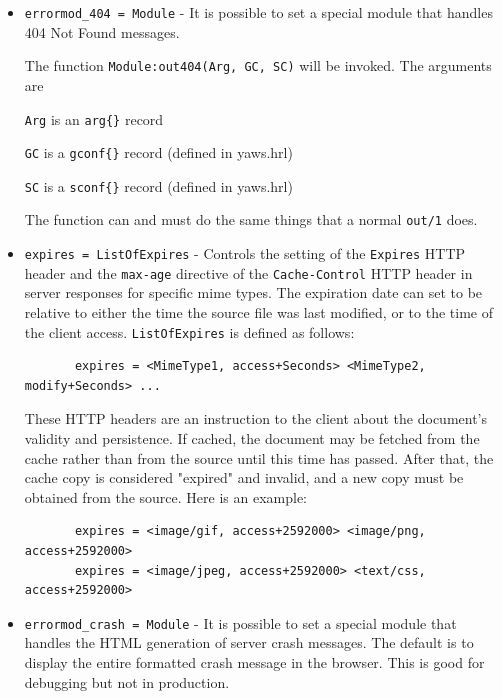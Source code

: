 \documentclass[11pt,oneside,english]{book}
\begin{document}
\begin{itemize}
\item     \verb+errormod_404 = Module+ -
              It is possible to set a special module  that
              handles 404 Not Found messages.

              The function \verb+Module:out404(Arg, GC, SC)+ will
              be invoked. The arguments are

              \verb+Arg+ is an \verb+arg{}+ record

              \verb+GC+ is a \verb+gconf{}+ record (defined in
              yaws.hrl)

              \verb+SC+ is a \verb+sconf{}+ record (defined in
              yaws.hrl)

              The function can and must do the same things
              that a normal \verb+out/1+ does.

\item       \verb+expires = ListOfExpires+ -
              Controls the setting of the \verb+Expires+ HTTP header and the
              \verb+max-age+ directive of the \verb+Cache-Control+ HTTP header
              in server responses for specific mime types. The expiration date
              can set to be relative to either the time the source file was last
              modified, or to the time of the client
              access. \verb+ListOfExpires+ is defined as follows:
\begin{verbatim}
       expires = <MimeType1, access+Seconds> <MimeType2, modify+Seconds> ...
\end{verbatim}
              These HTTP headers are an instruction to the client about the
              document's validity and persistence. If cached, the document may
              be fetched from the cache rather than from the source until this
              time has passed. After that, the cache copy is considered
              "expired" and invalid, and a new copy must be obtained from the
              source.
              Here is an example:
\begin{verbatim}
       expires = <image/gif, access+2592000> <image/png, access+2592000>
       expires = <image/jpeg, access+2592000> <text/css, access+2592000>
\end{verbatim}

\item       \verb+errormod_crash = Module+ -
              It  is possible to set a special module that
              handles the HTML generation of server  crash
              messages.  The  default  is  to  display the
              entire  formatted  crash   message   in   the
              browser.  This is good for debugging but not
              in production.


\end{itemize}
\end{document}
